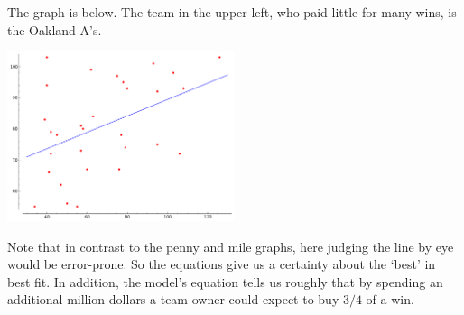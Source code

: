 The graph is below.
The team in the upper left, who paid little for many wins, is
the Oakland A's.

\begin{center}  \small
  \includegraphics[width=0.5\textwidth]{moneyball.pdf}
\end{center}

Note that in contrast to the penny and mile graphs, 
here judging the line by eye would be error-prone.
So the equations give us a certainty about the `best' in best fit.
In addition, the model's equation tells us roughly that 
by spending an additional million dollars
a team owner could expect to buy $3/4$ of a win.





